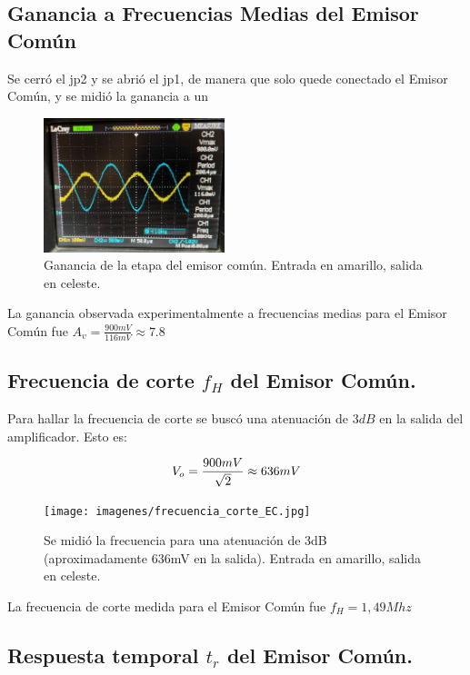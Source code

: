 \documentclass[letterpaper, 10 pt, conference]{ieeeconf}  %
\begin{document}
\subsection{\textbf{Ganancia a Frecuencias Medias del Emisor Común }}

Se cerró el jp2 y se abrió el jp1, de manera que solo quede conectado el Emisor Común, y se midió la ganancia a un

\begin{figure}[H]
  \centering
  \includegraphics[width=0.47\textwidth]{imagenes/gananciaEC.png}
  \caption{Ganancia de la etapa del emisor común. Entrada en amarillo, salida en celeste.}
  \label{fig:ganancia_EC}
\end{figure}

La ganancia observada experimentalmente a frecuencias medias para el Emisor Común fue $A_v = \frac{900mV}{116mV} \approx 7.8 $

\subsection{\textbf{Frecuencia de corte $f_H$ del Emisor Común.}}

Para hallar la frecuencia de corte se buscó una atenuación de $3dB$ en la salida del amplificador. Esto es:

\begin{equation}
V_o = \frac{900mV}{\sqrt{2}} \approx 636mV \\
\end{equation}

\begin{figure}[H]
  \centering
  \texttt{[image: imagenes/frecuencia\_corte\_EC.jpg]}
  \caption{Se midió la frecuencia para una atenuación de 3dB (aproximadamente 636mV en la salida). Entrada en amarillo, salida en celeste.}
  \label{fig:freq_corte_EC}
\end{figure}

La frecuencia de corte medida para el Emisor Común fue $f_H = 1,49Mhz$

\subsection{\textbf{Respuesta temporal $t_r$ del Emisor Común.}}
\end{document}
